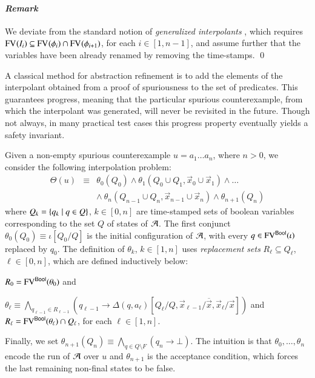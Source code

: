 \documentclass[10pt,conference,letterpaper,twocolumn]{IEEEtran}
\begin{document}
\paragraph{\em Remark} 
We deviate from the standard notion of \emph{generalized interpolants}
\cite{mcmillan06}, which requires $\mathrm{FV}^{}(I_i) \subseteq \mathrm{FV}^{}(\phi_i)
\cap \mathrm{FV}^{}(\phi_{i+1})$, for each $i \in [1,n-1]$, and assume further
that the variables have been already renamed by removing the
time-stamps. \qed

A classical method for abstraction refinement is to add the elements
of the interpolant obtained from a proof of spuriousness to the set of
predicates. This guarantees progress, meaning that the particular
spurious counterexample, from which the interpolant was generated,
will never be revisited in the future. Though not always, in many
practical test cases this progress property eventually yields a safety
invariant.

Given a non-empty spurious counterexample $u = a_1\ldots a_n$, where
$n>0$, we consider the following interpolation problem: 
\begin{eqnarray}\label{eq:interpolation-problem}
\Theta(u) & \equiv & \theta_0(Q_0) \wedge \theta_1(Q_0 \cup Q_1,\vec{x}_0
\cup \vec{x}_1) \wedge \ldots \\ 
&& \wedge~ \theta_n(Q_{n-1} \cup Q_n,\vec{x}_{n-1} \cup \vec{x}_n) \wedge \theta_{n+1}(Q_n) \nonumber
\end{eqnarray}
where $Q_k = \left\{ q_k \mid q \in Q \right\}$, $k \in [0,n]$ are time-stamped
sets of boolean variables corresponding to the set $Q$ of states of
$\mathcal{A}$. The first conjunct $\theta_0(Q_0) \equiv \iota[Q_0/Q]$ is the
initial configuration of $\mathcal{A}$, with every $q \in \mathrm{FV}^{\mathsf{Bool}}(\iota)$
replaced by $q_0$. The definition of $\theta_k$, $k\in[1,n]$ uses
\emph{replacement sets} $R_\ell \subseteq Q_\ell$, $\ell\in [0,n]$,
which are defined inductively below: \begin{compactitem}
\item $R_0 = \mathrm{FV}^{\mathsf{Bool}}(\theta_0)$ and 
%
\item $\theta_\ell \equiv \bigwedge_{q_{\ell-1}\in R_{\ell-1}}
  (q_{\ell-1} \rightarrow
  \Delta(q,a_\ell)[Q_\ell/Q,\vec{x}_{\ell-1}/\overline{\vec{x}},\vec{x}_\ell/\vec{x}])$
  and $R_\ell = \mathrm{FV}^{\mathsf{Bool}}(\theta_\ell) \cap Q_\ell$, for each
  $\ell\in[1,n]$.
\end{compactitem}
Finally, we set $\theta_{n+1}(Q_n) \equiv \bigwedge_{q \in Q \setminus
  F} (q_n \rightarrow \bot)$. The intuition is that $\theta_0, \ldots,
\theta_n$ encode the run of $\mathcal{A}$ over $u$ and $\theta_{n+1}$ is the
acceptance condition, which forces the last remaining non-final states
to be false. 
\end{document}
